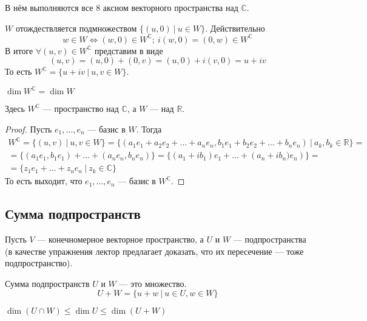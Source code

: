 \begin{Statement}
В нём выполняются все 8 аксиом векторного пространства над $\mathbb{C}$.
\end{Statement}
$W$ отождествляется подмножеством $\{\left(u, 0\right)\ |\ u\in W\}$. Действительно
\[
w\in W\Leftrightarrow \left(w,0\right) \in W^\mathbb{C};\ i\left(w,0\right) = \left(0, w\right) \in W^\mathbb{C}
\]
В итоге $\forall \left(u, v\right) \in W^\mathbb{C}$ представим в виде 
\[
\left(u,v\right) = \left(u,0\right) + \left(0,v\right) = \left(u,0\right) + i\left(v,0\right) = u+iv
\]
То есть $W^\mathbb{C} = \{u+iv\ |\ u,v\in W\}$. 
\begin{Suggestion}
$\dim W^\mathbb{C} = \dim W$
\end{Suggestion}
\begin{Comment}
Здесь $W^\mathbb{C}$ --- пространство над $\mathbb{C}$, а $W$ --- над $\mathbb{R}$.
\end{Comment}
\begin{proof}
Пусть $e_1, \ldots, e_n$ --- базис в $W$. Тогда 
\begin{gather*}
W^\mathbb{C} = \{\left(u,v\right)\ |\ u,v \in W\} = \{\left(a_1e_1 + a_2e_2 + \ldots + a_ne_n, b_1e_1 + b_2e_2 + \ldots + b_ne_n\right)\ |\ a_k,b_k \in \mathbb{R}\} = \\
= \{\left(a_1e_1,b_1e_1\right) + \ldots + \left(a_ne_n, b_ne_n\right)\} = \{\left(a_1+ib_1\right)e_1 + \ldots +\left(a_n + ib_n)e_n\right)\} = \\
= \{z_1e_1 + \ldots + z_ne_n\ |\ z_k \in \mathbb{C} \}
\end{gather*}
То есть выходит, что $e_1, \ldots, e_n$ --- базис в $W^\mathbb{C}$.
\end{proof}

\subsection{Сумма подпространств}
Пусть $V$ --- конечномерное векторное пространство, а $U$ и $W$ --- подпространства (в качестве упражнения лектор предлагает доказать, что их пересечение --- тоже подпространство).

\begin{Def}
Сумма подпространств $U$ и $W$ --- это множество.
\[
U+W = \{u + w\ |\ u \in U, w \in W\}
\]
\end{Def}

\begin{Comment}
$\dim \left( U \cap W \right) \leqslant \dim U \leqslant \dim \left(U + W\right)$
\end{Comment}

